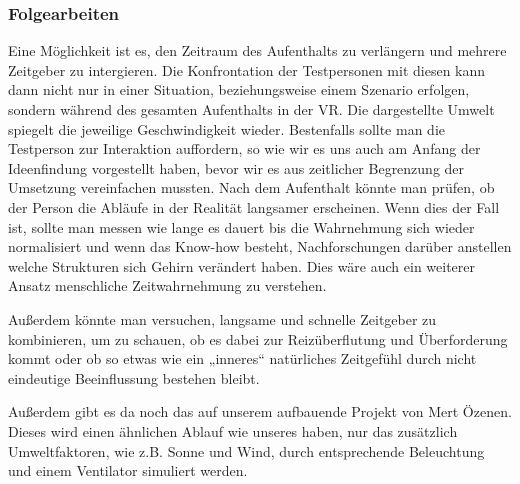 \documentclass{Bericht}
\begin{document}
\subsubsection{Folgearbeiten}
Eine Möglichkeit ist es, den Zeitraum des Aufenthalts zu verlängern und mehrere Zeitgeber zu intergieren. Die Konfrontation der Testpersonen mit diesen kann dann nicht nur in einer Situation, beziehungsweise einem Szenario erfolgen, sondern während des gesamten Aufenthalts in der VR. Die dargestellte Umwelt spiegelt die jeweilige Geschwindigkeit wieder. Bestenfalls sollte man die Testperson zur Interaktion auffordern, so wie wir es uns auch am Anfang der Ideenfindung vorgestellt haben, bevor wir es aus zeitlicher Begrenzung der Umsetzung vereinfachen mussten. Nach dem Aufenthalt könnte man prüfen, ob der Person die Abläufe in der Realität langsamer erscheinen. Wenn dies der Fall ist, sollte man messen wie lange es dauert bis die Wahrnehmung sich wieder normalisiert und wenn das Know-how besteht, Nachforschungen darüber anstellen welche Strukturen sich Gehirn verändert haben. Dies wäre auch ein weiterer Ansatz menschliche Zeitwahrnehmung zu verstehen.

Außerdem könnte man versuchen, langsame und schnelle Zeitgeber zu  kombinieren, um zu schauen, ob es dabei zur Reizüberflutung und Überforderung kommt oder ob so etwas wie ein „inneres“ natürliches Zeitgefühl durch nicht eindeutige Beeinflussung bestehen bleibt.


Außerdem gibt es da noch das auf unserem aufbauende Projekt von Mert Özenen. Dieses wird einen ähnlichen Ablauf wie unseres haben, nur das zusätzlich Umweltfaktoren, wie z.B. Sonne und Wind, durch entsprechende Beleuchtung und einem Ventilator simuliert werden.
\end{document}
